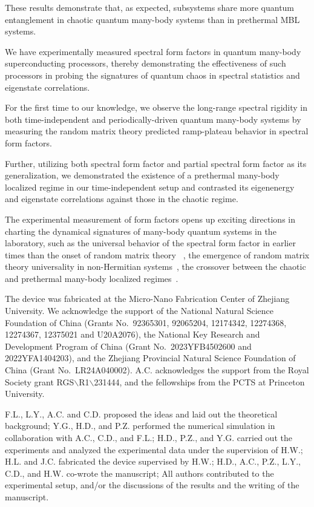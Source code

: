 \documentclass[aps,prx,reprint,twocolumn,superscriptaddress,floatfix,nofootinbib]{revtex4-2}
\begin{document}
These results demonstrate that, as expected, subsystems share more quantum entanglement in chaotic quantum many-body systems than in prethermal MBL systems.

We have experimentally measured spectral form factors in quantum many-body superconducting processors,
thereby demonstrating the effectiveness of such processors in probing the signatures of quantum chaos in spectral statistics and eigenstate correlations.

For the first time to our knowledge, we observe the long-range spectral rigidity in both time-independent and periodically-driven quantum many-body systems by measuring the random matrix theory predicted ramp-plateau behavior in spectral form factors.

Further, utilizing both spectral form factor and partial spectral form factor as its generalization, we demonstrated the existence of a prethermal many-body localized regime in our time-independent setup and contrasted its eigenenergy and eigenstate correlations against those in the chaotic regime.

The experimental measurement of form factors opens up exciting directions in charting the dynamical signatures of many-body quantum systems in the laboratory, such as the universal behavior of the spectral form factor in earlier times than the onset of random matrix theory
~\cite{chan2018spectral, Gharibyan_2018,Dag:2022vqb, yoshimura2023operator}, the emergence of random matrix theory universality in non-Hermitian systems~\cite{Shivam_2023}, the crossover
between the chaotic and prethermal many-body localized regimes~\cite{chaoschallengeMBL}.

\vskip 0.5cm

 The device was fabricated at the Micro-Nano Fabrication Center of Zhejiang University.
We acknowledge the support of the National Natural Science Foundation of China (Grants No.~92365301, 92065204, 12174342, 12274368, 12274367, 12375021 and U20A2076), the National Key Research and Development Program of China (Grant No.~2023YFB4502600 and 2022YFA1404203), and the Zhejiang Provincial Natural Science Foundation of China (Grant No.~LR24A040002).
A.C. acknowledges the support from the Royal Society grant RGS{$\backslash$}R1{$\backslash$}231444, and the fellowships from the PCTS at Princeton University.

\vskip 0.5cm

 F.L., L.Y., A.C. and C.D. proposed the ideas and laid out the theoretical background; Y.G., H.D., and P.Z. performed the numerical simulation in collaboration with A.C., C.D., and F.L.; H.D., P.Z., and Y.G. carried out the experiments and analyzed the experimental data under the supervision of H.W.; H.L. and J.C. fabricated the device supervised by H.W.; H.D., A.C., P.Z., L.Y., C.D., and H.W. co-wrote the manuscript; All authors contributed to the experimental setup, and/or the discussions of the results and the writing of the manuscript.
\end{document}
